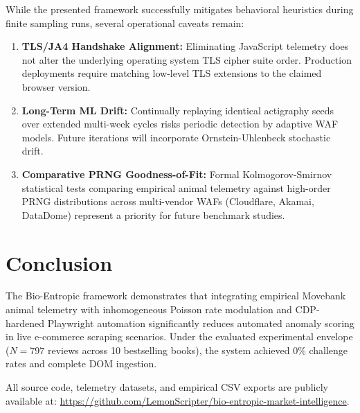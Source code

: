 \documentclass[11pt,a4paper]{article}
\begin{document}
While the presented framework successfully mitigates behavioral heuristics during finite sampling runs, several operational caveats remain:

\begin{enumerate}
    \item \textbf{TLS/JA4 Handshake Alignment:} Eliminating JavaScript telemetry does not alter the underlying operating system TLS cipher suite order. Production deployments require matching low-level TLS extensions to the claimed browser version.
    \item \textbf{Long-Term ML Drift:} Continually replaying identical actigraphy seeds over extended multi-week cycles risks periodic detection by adaptive WAF models. Future iterations will incorporate Ornstein-Uhlenbeck stochastic drift.
    \item \textbf{Comparative PRNG Goodness-of-Fit:} Formal Kolmogorov-Smirnov statistical tests comparing empirical animal telemetry against high-order PRNG distributions across multi-vendor WAFs (Cloudflare, Akamai, DataDome) represent a priority for future benchmark studies.
\end{enumerate}

\section{Conclusion}

The Bio-Entropic framework demonstrates that integrating empirical Movebank animal telemetry with inhomogeneous Poisson rate modulation and CDP-hardened Playwright automation significantly reduces automated anomaly scoring in live e-commerce scraping scenarios. Under the evaluated experimental envelope ($N=797$ reviews across 10 bestselling books), the system achieved 0\% challenge rates and complete DOM ingestion.

\noindent All source code, telemetry datasets, and empirical CSV exports are publicly available at:  
\url{https://github.com/LemonScripter/bio-entropic-market-intelligence}.
\end{document}
